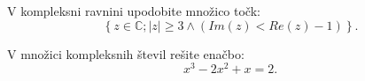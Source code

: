 \documentclass[addpoints]{exam}
\begin{document}
\begin{questions}



    \question[6]
        V kompleksni ravnini upodobite množico točk:                     
            $$\left\{z\in\mathbb{C}; \left|z\right|\geq3 \land \left(Im(z)<Re(z)-1\right) \right\}. $$ 
        



    \question[6]
        V množici kompleksnih števil rešite enačbo: $$x^3-2x^2+x=2.$$












\end{questions}
\end{document}
